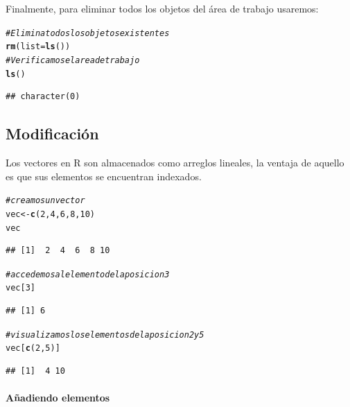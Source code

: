 \documentclass[11pt,a4paper,oneside]{book}\usepackage[]{graphicx}\usepackage[]{color}
\makeatletter
\newcommand{\hlnum}[1]{\textcolor[rgb]{0.686,0.059,0.569}{#1}}%
\newcommand{\hlcom}[1]{\textcolor[rgb]{0.678,0.584,0.686}{\textit{#1}}}%
\newcommand{\hlstd}[1]{\textcolor[rgb]{0.345,0.345,0.345}{#1}}%
\newcommand{\hlkwb}[1]{\textcolor[rgb]{0.69,0.353,0.396}{#1}}%
\newcommand{\hlkwc}[1]{\textcolor[rgb]{0.333,0.667,0.333}{#1}}%
\newcommand{\hlkwd}[1]{\textcolor[rgb]{0.737,0.353,0.396}{\textbf{#1}}}%
\newenvironment{kframe}{%
 \def\at@end@of@kframe{}%
 \ifinner\ifhmode%
  \def\at@end@of@kframe{\end{minipage}}%
  \begin{minipage}{\columnwidth}%
 \fi\fi%
 \def\FrameCommand##1{\hskip\@totalleftmargin \hskip-\fboxsep
 \colorbox{shadecolor}{##1}\hskip-\fboxsep
     \hskip-\linewidth \hskip-\@totalleftmargin \hskip\columnwidth}%
 \MakeFramed {\advance\hsize-\width
   \@totalleftmargin\z@ \linewidth\hsize
   \@setminipage}}%
 {\par\unskip\endMakeFramed%
 \at@end@of@kframe}
\newenvironment{knitrout}{}{} %
\makeatother
\begin{document}
\begin{itemize}
Finalmente, para eliminar todos los objetos del área de trabajo usaremos:
\begin{knitrout}
\color{fgcolor}\begin{kframe}
\begin{alltt}
\hlcom{# Elimina todos los objetos existentes}
\hlkwd{rm}\hlstd{(}\hlkwc{list}\hlstd{=}\hlkwd{ls}\hlstd{())}
\hlcom{# Verificamos el area de trabajo}
\hlkwd{ls}\hlstd{()}
\end{alltt}
\begin{verbatim}
## character(0)
\end{verbatim}
\end{kframe}
\end{knitrout}

\subsection{Modificación}

Los vectores en R son almacenados como arreglos lineales, la ventaja de aquello es que sus elementos se encuentran indexados. 
\begin{knitrout}
\color{fgcolor}\begin{kframe}
\begin{alltt}
\hlcom{# creamos un vector}
\hlstd{vec} \hlkwb{<-} \hlkwd{c}\hlstd{(}\hlnum{2}\hlstd{,} \hlnum{4}\hlstd{,} \hlnum{6}\hlstd{,} \hlnum{8}\hlstd{,} \hlnum{10}\hlstd{)}
\hlstd{vec}
\end{alltt}
\begin{verbatim}
## [1]  2  4  6  8 10
\end{verbatim}
\begin{alltt}
\hlcom{# accedemos al elemento de la posicion 3}
\hlstd{vec[}\hlnum{3}\hlstd{]}
\end{alltt}
\begin{verbatim}
## [1] 6
\end{verbatim}
\begin{alltt}
\hlcom{# visualizamos los elementos de la posicion 2 y 5}
\hlstd{vec[}\hlkwd{c}\hlstd{(}\hlnum{2}\hlstd{,} \hlnum{5}\hlstd{)]}
\end{alltt}
\begin{verbatim}
## [1]  4 10
\end{verbatim}
\end{kframe}
\end{knitrout}

\paragraph{Añadiendo elementos}
~\\


\end{itemize}
\end{document}
